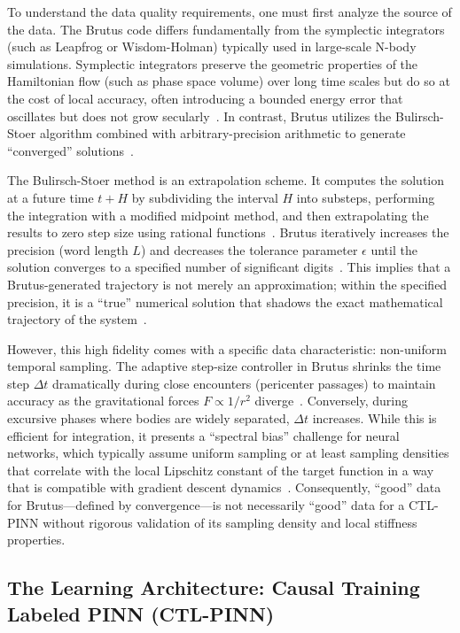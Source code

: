 To understand the data quality requirements, one must first analyze the source of the data. The Brutus code differs fundamentally from the symplectic integrators (such as Leapfrog or Wisdom-Holman) typically used in large-scale N-body simulations. Symplectic integrators preserve the geometric properties of the Hamiltonian flow (such as phase space volume) over long time scales but do so at the cost of local accuracy, often introducing a bounded energy error that oscillates but does not grow secularly~\cite{ref1}. In contrast, Brutus utilizes the Bulirsch-Stoer algorithm combined with arbitrary-precision arithmetic to generate ``converged'' solutions~\cite{ref3}.

The Bulirsch-Stoer method is an extrapolation scheme. It computes the solution at a future time $t + H$ by subdividing the interval $H$ into substeps, performing the integration with a modified midpoint method, and then extrapolating the results to zero step size using rational functions~\cite{ref3}. Brutus iteratively increases the precision (word length $L$) and decreases the tolerance parameter $\epsilon$ until the solution converges to a specified number of significant digits~\cite{ref3}. This implies that a Brutus-generated trajectory is not merely an approximation; within the specified precision, it is a ``true'' numerical solution that shadows the exact mathematical trajectory of the system~\cite{ref3}.

However, this high fidelity comes with a specific data characteristic: non-uniform temporal sampling. The adaptive step-size controller in Brutus shrinks the time step $\Delta t$ dramatically during close encounters (pericenter passages) to maintain accuracy as the gravitational forces $F \propto 1/r^2$ diverge~\cite{ref6}. Conversely, during excursive phases where bodies are widely separated, $\Delta t$ increases. While this is efficient for integration, it presents a ``spectral bias'' challenge for neural networks, which typically assume uniform sampling or at least sampling densities that correlate with the local Lipschitz constant of the target function in a way that is compatible with gradient descent dynamics~\cite{ref8}. Consequently, ``good'' data for Brutus—defined by convergence—is not necessarily ``good'' data for a CTL-PINN without rigorous validation of its sampling density and local stiffness properties.

\subsection{The Learning Architecture: Causal Training Labeled PINN (CTL-PINN)}

